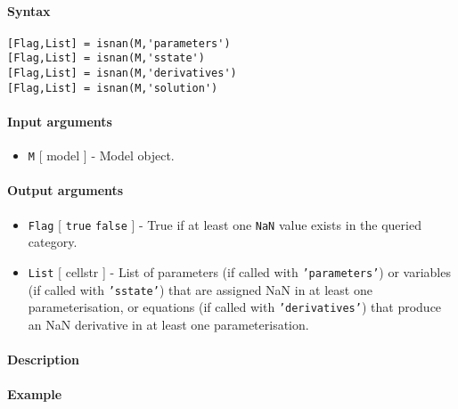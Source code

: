 


	\paragraph{Syntax}

\begin{verbatim}
[Flag,List] = isnan(M,'parameters')
[Flag,List] = isnan(M,'sstate')
[Flag,List] = isnan(M,'derivatives')
[Flag,List] = isnan(M,'solution')
\end{verbatim}

\paragraph{Input arguments}

\begin{itemize}
\itemsep1pt\parskip0pt
\item
  \texttt{M} {[} model {]} - Model object.
\end{itemize}

\paragraph{Output arguments}

\begin{itemize}
\item
  \texttt{Flag} {[} \texttt{true} \textbar{} \texttt{false} {]} - True
  if at least one \texttt{NaN} value exists in the queried category.
\item
  \texttt{List} {[} cellstr {]} - List of parameters (if called with
  \texttt{'parameters'}) or variables (if called with \texttt{'sstate'})
  that are assigned NaN in at least one parameterisation, or equations
  (if called with \texttt{'derivatives'}) that produce an NaN derivative
  in at least one parameterisation.
\end{itemize}

\paragraph{Description}

\paragraph{Example}


